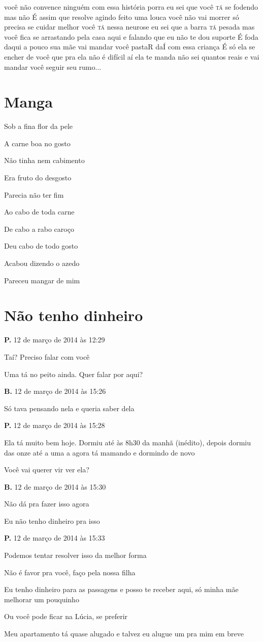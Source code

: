 você não convence ninguém com essa história porra eu sei que você \textsc{tá} se
fodendo mas não É assim que resolve agindo feito uma louca você não vai
morrer só precisa se cuidar melhor você \textsc{tá} nessa neurose eu sei que a
barra \textsc{tá} pesada mas você fica se arrastando pela casa aqui e falando que
eu não te dou suporte É foda daqui a pouco sua mãe vai mandar você
pastaR daÍ com essa criança É só ela se encher de você que pra ela não é
difícil aí ela te manda não sei quantos reais e vai mandar você seguir
seu rumo...

\chapter{Manga}

{\parindent0pt
Sob a fina flor da pele

A carne boa no gosto

Não tinha nem cabimento

Era fruto do desgosto

Parecia não ter fim\medskip 

Ao cabo de toda carne

De cabo a rabo caroço

Deu cabo de todo gosto

Acabou dizendo o azedo

Pareceu mangar de mim
}

\chapter{Não tenho dinheiro}

{\parindent0pt\parskip1pt\raggedright
\textbf{P.} 12 de março de 2014 às 12:29

Taí? Preciso falar com você

Uma tá no peito ainda. Quer falar por aqui?

\textbf{B.} 12 de março de 2014 às 15:26

Só tava pensando nela e queria saber dela

\textbf{P.} 12 de março de 2014 às 15:28

Ela tá muito bem hoje. Dormiu até às 8h30 da manhã (inédito), depois
dormiu das onze até a uma a agora tá mamando e dormindo de novo

Você vai querer vir ver ela?

\textbf{B.} 12 de março de 2014 às 15:30

Não dá pra fazer isso agora

Eu não tenho dinheiro pra isso

\textbf{P.} 12 de março de 2014 às 15:33

Podemos tentar resolver isso da melhor forma

Não é favor pra você, faço pela nossa filha

Eu tenho dinheiro para as passagens e posso te receber aqui, só minha
mãe melhorar um pouquinho

Ou você pode ficar na Lúcia, se preferir

Meu apartamento tá quase alugado e talvez eu alugue um pra mim em breve
}

